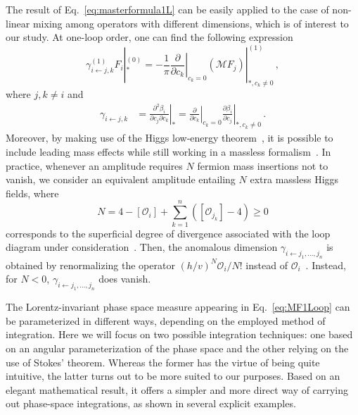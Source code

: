 The result of Eq.~\eqref{eq:masterformula1L} can be easily applied to the case of non-linear mixing among operators with different dimensions, which is of interest to our study. At one-loop order, one can find the following expression~\cite{Bresciani:2023jsu} 
%
\begin{equation}
\label{eq:mastergammaijk}
\gamma_{i\leftarrow j,k}^{(1)}F_i|_{*}^{(0)} = -\frac{1}{\pi}\left.\frac{\partial}{\partial c_k}\right|_{c_k=0}(\mathcal M F_j)|_{*,c_k\neq 0}^{(1)} \,,
\end{equation}
%
where $j,k\neq i$ and
%
\begin{align}
    \gamma_{i\leftarrow j,k}&=\left. \frac{\partial^2 \beta_i}{\partial c_j \partial c_k}\right|_{*} = \left.\frac{\partial}{\partial c_k}\right|_{c_k=0} \left.\frac{\partial \beta_i}{\partial c_j}\right|_{*,c_k\neq 0} \,.
    \label{eq:gamma_ijk}
\end{align}
% 
Moreover, by making use of the Higgs low-energy theorem~\cite{Ellis:1975ap,Shifman:1979eb}, it is possible to include leading mass effects while still working in a massless formalism~\cite{Bresciani:2023jsu}. 
%
In practice, whenever an amplitude requires $N$ fermion mass insertions not to vanish, we consider an equivalent amplitude entailing $N$ extra massless Higgs fields, where 
%
\begin{equation}
N = 4-[\mathcal{O}_{i}] +\sum^n_{k=1} ([\mathcal{O}_{j_k}]-4)\geq 0
\label{eq:superficial_div}
\end{equation}
%
corresponds to the superficial degree of divergence associated with the loop diagram under consideration~\cite{Bresciani:2023jsu}.
%
Then, the anomalous dimension
$\gamma_{i\leftarrow j_1, \dotsc, j_n}$ 
is obtained by renormalizing the operator $(h/v)^N\mathcal{O}_i/N!$
instead of $\mathcal{O}_i$~\cite{Bresciani:2023jsu}.
Instead, for $N < 0$, $\gamma_{i\leftarrow j_1, \dotsc, j_n}$ does vanish.

%
The Lorentz-invariant phase space measure appearing in Eq.~\eqref{eq:MF1Loop} can be parameterized in different ways, depending on the employed method of integration. 
Here we will focus on two possible integration techniques: one based on an angular parameterization of the phase space and the other relying on the use of Stokes' theorem.
Whereas the former has the virtue of being quite intuitive, the latter turns out to be more suited to our purposes. Based on an elegant mathematical result, it offers a simpler and more direct way of carrying out phase-space integrations, as shown in several explicit examples.


